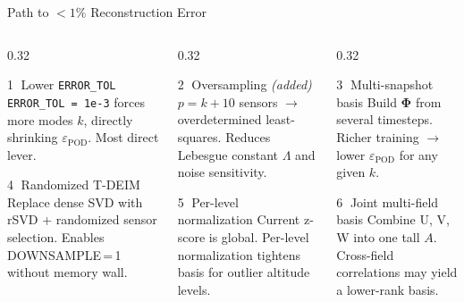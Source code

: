 \documentclass[aspectratio=169, 11pt]{beamer}
\newcommand{\epod}{\varepsilon_{\mathrm{POD}}}
\newcommand{\Phimat}{\boldsymbol{\Phi}}
\begin{document}
\begin{frame}{Path to ${<}1\%$ Reconstruction Error}
\begin{columns}[T]

\begin{column}{0.32\textwidth}
  \begin{block}{\textcircled{\scriptsize 1}\; Lower \texttt{ERROR\_TOL}}
    \small \texttt{ERROR\_TOL = 1e-3} forces more modes $k$,
    directly shrinking $\epod$. Most direct lever.
  \end{block}\vspace{0.3em}
  \begin{block}{\textcircled{\scriptsize 4}\; Randomized T-DEIM}
    \small Replace dense SVD with rSVD + randomized sensor selection.
    Enables DOWNSAMPLE\,=\,1 without memory wall.
  \end{block}
\end{column}

\begin{column}{0.32\textwidth}
  \begin{block}{\textcircled{\scriptsize 2}\; Oversampling \emph{(added)}}
    \small $p = k + 10$ sensors $\to$ overdetermined least-squares.
    Reduces Lebesgue constant $\Lambda$ and noise sensitivity.
  \end{block}\vspace{0.3em}
  \begin{block}{\textcircled{\scriptsize 5}\; Per-level normalization}
    \small Current z-score is global.
    Per-level normalization tightens basis for outlier altitude levels.
  \end{block}
\end{column}

\begin{column}{0.32\textwidth}
  \begin{block}{\textcircled{\scriptsize 3}\; Multi-snapshot basis}
    \small Build $\Phimat$ from several timesteps.
    Richer training $\to$ lower $\epod$ for any given $k$.
  \end{block}\vspace{0.3em}
  \begin{block}{\textcircled{\scriptsize 6}\; Joint multi-field basis}
    \small Combine U, V, W into one tall $A$.
    Cross-field correlations may yield a lower-rank basis.
  \end{block}
\end{column}

\end{columns}
\end{frame}
\end{document}
